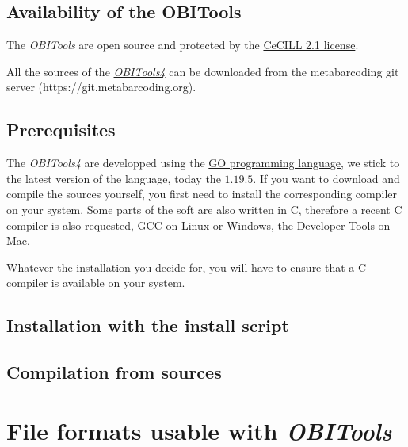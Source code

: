 \documentclass[
  letterpaper,
  DIV=11,
  numbers=noendperiod]{scrreprt}
\begin{document}
\hypertarget{availability-of-the-obitools}{%
\section{Availability of the
OBITools}\label{availability-of-the-obitools}}

The \emph{OBITools} are open source and protected by the
\href{http://www.cecill.info/licences/Licence_CeCILL_V2.1-en.html}{CeCILL
2.1 license}.

All the sources of the
\href{http://metabarcoding.org/obitools4}{\emph{OBITools4}} can be
downloaded from the metabarcoding git server
(https://git.metabarcoding.org).

\hypertarget{prerequisites}{%
\section{Prerequisites}\label{prerequisites}}

The \emph{OBITools4} are developped using the \href{https://go.dev/}{GO
programming language}, we stick to the latest version of the language,
today the \(1.19.5\). If you want to download and compile the sources
yourself, you first need to install the corresponding compiler on your
system. Some parts of the soft are also written in C, therefore a recent
C compiler is also requested, GCC on Linux or Windows, the Developer
Tools on Mac.

Whatever the installation you decide for, you will have to ensure that a
C compiler is available on your system.

\hypertarget{installation-with-the-install-script}{%
\section{Installation with the install
script}\label{installation-with-the-install-script}}

\hypertarget{compilation-from-sources}{%
\section{Compilation from sources}\label{compilation-from-sources}}

\hypertarget{file-formats-usable-with-obitools}{%
\chapter{\texorpdfstring{File formats usable with
\emph{OBITools}}{File formats usable with OBITools}}\label{file-formats-usable-with-obitools}}
\end{document}
